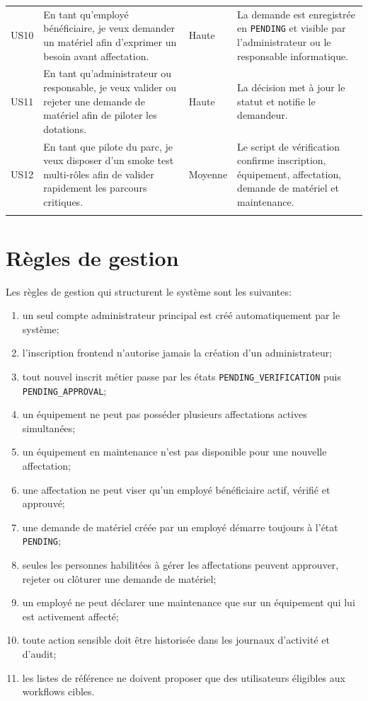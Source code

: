 \begin{longtable}{p{1.5cm}p{4.8cm}p{3cm}p{5.1cm}}
US10 & En tant qu'employé bénéficiaire, je veux demander un matériel afin d'exprimer un besoin avant affectation. & Haute & La demande est enregistrée en \texttt{PENDING} et visible par l'administrateur ou le responsable informatique. \\
US11 & En tant qu'administrateur ou responsable, je veux valider ou rejeter une demande de matériel afin de piloter les dotations. & Haute & La décision met à jour le statut et notifie le demandeur. \\
US12 & En tant que pilote du parc, je veux disposer d'un smoke test multi-rôles afin de valider rapidement les parcours critiques. & Moyenne & Le script de vérification confirme inscription, équipement, affectation, demande de matériel et maintenance. \\
\bottomrule
\label{tab:user-stories}
\end{longtable}

\section{Règles de gestion}
Les règles de gestion qui structurent le système sont les suivantes:
\begin{enumerate}
  \item un seul compte administrateur principal est créé automatiquement par le système;
  \item l'inscription frontend n'autorise jamais la création d'un administrateur;
  \item tout nouvel inscrit métier passe par les états \texttt{PENDING\_VERIFICATION} puis \texttt{PENDING\_APPROVAL};
  \item un équipement ne peut pas posséder plusieurs affectations actives simultanées;
  \item un équipement en maintenance n'est pas disponible pour une nouvelle affectation;
  \item une affectation ne peut viser qu'un employé bénéficiaire actif, vérifié et approuvé;
  \item une demande de matériel créée par un employé démarre toujours à l'état \texttt{PENDING};
  \item seules les personnes habilitées à gérer les affectations peuvent approuver, rejeter ou clôturer une demande de matériel;
  \item un employé ne peut déclarer une maintenance que sur un équipement qui lui est activement affecté;
  \item toute action sensible doit être historisée dans les journaux d'activité et d'audit;
  \item les listes de référence ne doivent proposer que des utilisateurs éligibles aux workflows cibles.
\end{enumerate}


